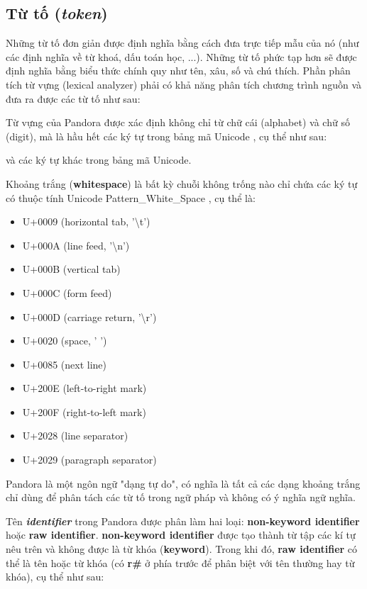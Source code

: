 \subsection{Từ tố (\textit{token})}
    Những từ tố đơn giản được định nghĩa bằng cách đưa trực tiếp mẫu của nó (như các định nghĩa về từ khoá, dấu toán học, ...). Những từ tố phức tạp hơn sẽ được định nghĩa bằng biểu thức chính quy như tên, xâu, số và chú thích. Phần phân tích từ vựng (lexical analyzer) phải có khả năng phân tích chương trình nguồn và đưa ra được các từ tố như sau:



    Từ vựng của Pandora được xác định không chỉ từ chữ cái (alphabet) và chữ số (digit), mà là hầu hết các ký tự trong bảng mã Unicode \cite{allen2012unicode}, cụ thể như sau:

    \regexdigit

    \regexalphabet

\noindent và các ký tự khác trong bảng mã Unicode.

    Khoảng trắng (\textbf{whitespace}) là bất kỳ chuỗi không trống nào chỉ chứa các ký tự có thuộc tính Unicode Pattern\_White\_Space \cite{web:unicode:report}, cụ thể là:
    \begin{itemize}
        \item{U+0009 (horizontal tab, '\textbackslash t')}
        \item{U+000A (line feed, '\textbackslash n')}
        \item{U+000B (vertical tab)}
        \item{U+000C (form feed)}
        \item{U+000D (carriage return, '\textbackslash r')}
        \item{U+0020 (space, ' ')}
        \item{U+0085 (next line)}
        \item{U+200E (left-to-right mark)}
        \item{U+200F (right-to-left mark)}
        \item{U+2028 (line separator)}
        \item{U+2029 (paragraph separator)}
    \end{itemize}
\noindent Pandora là một ngôn ngữ "dạng tự do", có nghĩa là tất cả các dạng khoảng trắng chỉ dùng để phân tách các từ tố trong ngữ pháp và không có ý nghĩa ngữ nghĩa.

Tên \textbf{\textit{identifier}} trong Pandora được phân làm hai loại: \textbf{non-keyword identifier} hoặc \textbf{raw identifier}. \textbf{non-keyword identifier} được tạo thành từ tập các kí tự nêu trên và không được là từ khóa (\textbf{keyword}). Trong khi đó, \textbf{raw identifier} có thể là tên hoặc từ khóa (có \textbf{r\#} ở phía trước để phân biệt với tên thường hay từ khóa), cụ thể như sau:

